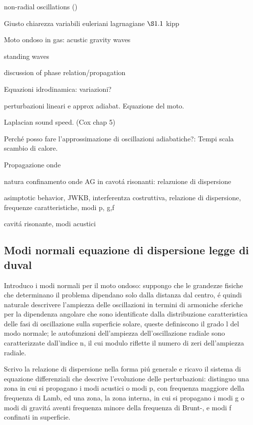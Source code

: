 \begin{itemize*}
\item non-radial oscillations  (\cite{han12stellar})
\item Giusto chiarezza variabili euleriani lagrnagiane $\S 1.1$ kipp

\item Moto ondoso in gas: acustic gravity waves
\item standing waves
\item discussion of phase relation/propagation
\item Equazioni idrodinamica: variazioni?
\item perturbazioni lineari e approx adiabat. Equazione del moto.
\item Laplacian sound speed. (Cox chap 5)
\item Perch\'e posso fare l'approssimazione di oscillazioni adiabatiche?: Tempi scala scambio di calore.
\item Propagazione onde \cite{tol63waves}
\item natura confinamento onde AG in cavot\'a risonanti: relazuione di dispersione

\item asimptotic behavior, JWKB, interferentza costruttiva, relazione di dispersione, frequenze caratteristiche, modi p, g,f
\item cavit\'a risonante, modi acustici
\end{itemize*}


\subsection{Modi normali equazione di dispersione legge di duval}
Introduco i modi normali per il moto ondoso: suppongo che le grandezze fisiche che determinano il problema dipendano solo dalla distanza dal centro, \'e quindi naturale descrivere l'ampiezza delle oscillazioni  in termini di armoniche sferiche per la dipendenza angolare che sono identificate dalla distribuzione caratteristica delle fasi di oscillazione sulla superficie solare, queste definiscono il grado l del modo normale; le autofunzioni dell'ampiezza dell'oscillazione radiale sono caratterizzate dall'indice n, il cui modulo riflette il numero di zeri dell'ampiezza radiale.

Scrivo la relazione di dispersione nella forma pi\'u generale e ricavo il sistema di equazione differenziali che descrive l'evoluzione delle perturbazioni: distinguo una zona in cui si propagano i modi acustici o modi p, con frequenza maggiore della frequenza di Lamb, ed una zona, la zona interna, in cui si propagano i modi g o modi di gravit\'a aventi frequenza minore della frequenza di Brunt-\vai{}, e modi f confinati in superficie. 

